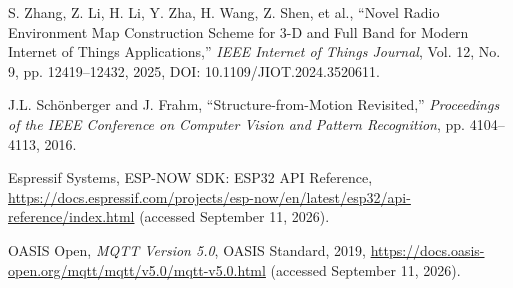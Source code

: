 \documentclass[11pt,a4paper]{article}
\begin{document}
\begin{enumerate}[label={[\arabic*]}, ref=\arabic*, leftmargin=2.6em, labelsep=0.6em, itemsep=3pt, topsep=4pt]
  \item\label{bib:16} S. Zhang, Z. Li, H. Li, Y. Zha, H. Wang, Z. Shen, et al., ``Novel Radio Environment Map Construction
Scheme for 3-D and Full Band for Modern Internet of Things Applications,'' \textit{IEEE Internet of
Things Journal}, Vol. 12, No. 9, pp. 12419--12432, 2025, DOI: 10.1109/JIOT.2024.3520611.

  \item\label{bib:17} J.L. Schönberger and J. Frahm, ``Structure-from-Motion Revisited,'' \textit{Proceedings of the IEEE
Conference on Computer Vision and Pattern Recognition}, pp. 4104--4113, 2016.

  \item\label{bib:18} Espressif Systems, ESP-NOW SDK: ESP32 API Reference, \url{https://docs.espressif.com/projects/esp-now/en/latest/esp32/api-reference/index.html} (accessed September 11, 2026).

  \item\label{bib:19} OASIS Open, \textit{MQTT Version 5.0}, OASIS Standard, 2019, \url{https://docs.oasis-open.org/mqtt/mqtt/v5.0/mqtt-v5.0.html} (accessed September 11, 2026).

\end{enumerate}
\end{document}
